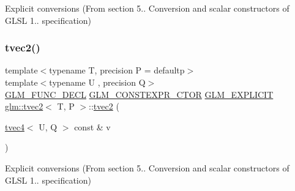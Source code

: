 Explicit conversions (From section 5.. Conversion and scalar constructors of G\+L\+SL 1.. specification) 

\mbox{\label{structglm_1_1tvec2_a14d29e21c541c5efe511679d2d7c788a}} 
\subsubsection{\texorpdfstring{tvec2()}{tvec2()}\hspace{0.1cm}{\footnotesize\ttfamily [10/17]}}
{\footnotesize\ttfamily template$<$typename T, precision P = defaultp$>$ \\
template$<$typename U , precision Q$>$ \\
\mbox{\hyperlink{setup_8hpp_ab2d052de21a70539923e9bcbf6e83a51}{G\+L\+M\+\_\+\+F\+U\+N\+C\+\_\+\+D\+E\+CL}} \mbox{\hyperlink{setup_8hpp_ad34178a09666081abdb573c14d1f4a5a}{G\+L\+M\+\_\+\+C\+O\+N\+S\+T\+E\+X\+P\+R\+\_\+\+C\+T\+OR}} \mbox{\hyperlink{setup_8hpp_a6c74f5a5e7b134ab69023ff9a30d4d5d}{G\+L\+M\+\_\+\+E\+X\+P\+L\+I\+C\+IT}} \mbox{\hyperlink{structglm_1_1tvec2}{glm\+::tvec2}}$<$ T, P $>$\+::\mbox{\hyperlink{structglm_1_1tvec2}{tvec2}} (\begin{DoxyParamCaption}\item[{\mbox{\hyperlink{structglm_1_1tvec4}{tvec4}}$<$ U, Q $>$ const \&}]{v }\end{DoxyParamCaption})}



Explicit conversions (From section 5.. Conversion and scalar constructors of G\+L\+SL 1.. specification) 

\mbox{\label{structglm_1_1tvec2_a831bbad1e14099b7b8fe77b5efeb7c47}} 
